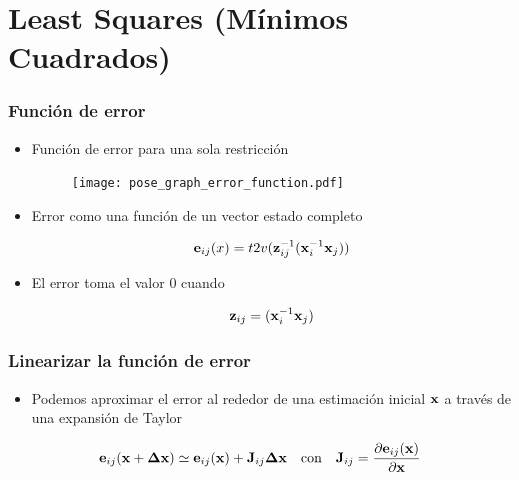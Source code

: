 \section{Least Squares (Mínimos Cuadrados)}


\begin{frame}
    \frametitle{Función de error}
    
    \begin{itemize}
        \item Función de error para una sola restricción
        \begin{figure}
            \texttt{[image: pose\_graph\_error\_function.pdf]}
        \end{figure}
        
        \item Error como una función de un vector estado completo
        
        \begin{equation*}
            \boldsymbol{\mathbf{e}}_{ij}(x) = t2v({\boldsymbol{\mathbf{z}}}^{-1}_{ij}({\boldsymbol{\mathbf{x}}}^{-1}_{i}\boldsymbol{\mathbf{x}}_{j}))
        \end{equation*}
        
        \item El error toma el valor 0 cuando
        
        \begin{equation*}
            \boldsymbol{\mathbf{z}}_{ij} = ({\boldsymbol{\mathbf{x}}}^{-1}_{i}\boldsymbol{\mathbf{x}}_{j})
        \end{equation*}
        
    \end{itemize}
\end{frame}

\begin{frame}
    \frametitle{Linearizar la función de error}
    
    \begin{itemize}
        \item Podemos aproximar el error al rededor de una estimación inicial $\boldsymbol{\mathbf{x}}$ a través de una expansión de Taylor
    \end{itemize}

    \begin{equation*}
        \boldsymbol{\mathbf{e}}_{ij}(\boldsymbol{\mathbf{x}} + \boldsymbol{\mathbf{\Delta}}\boldsymbol{\mathbf{x}}) \simeq  \boldsymbol{\mathbf{e}}_{ij}(\boldsymbol{\mathbf{x}}) + \boldsymbol{\mathbf{J}}_{ij}\boldsymbol{\mathbf{\Delta}}\boldsymbol{\mathbf{x}} \quad \text{con} \quad \boldsymbol{\mathbf{J}}_{ij} = \dfrac{\partial\boldsymbol{\mathbf{e}}_{ij}(\boldsymbol{\mathbf{x}})}{\partial\boldsymbol{\mathbf{x}}}
    \end{equation*}
    
\end{frame}

